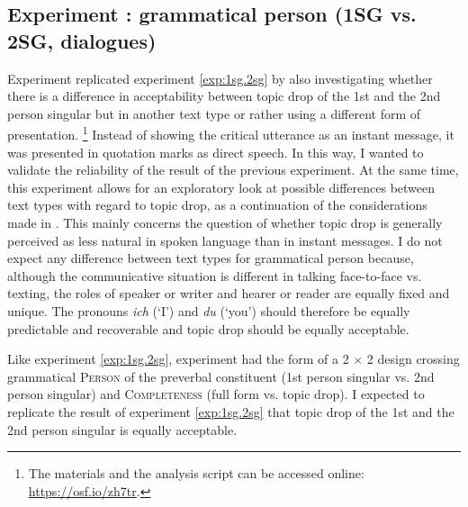 \subsection{Experiment : grammatical person (1SG vs. 2SG, dialogues) }
\label{sec:exp.1sg.2sg.spoken}
Experiment  replicated experiment \ref*{exp:1sg.2sg} by also investigating whether there is a difference in acceptability between topic drop of the 1st and the 2nd person singular but in another text type  or rather using a different form of presentation.%
\footnote{The materials and the analysis script can be accessed online: \url{https://osf.io/zh7tr}.}
%
Instead of showing the critical utterance as an instant message, it was presented in quotation marks as direct speech.
In this way, I wanted to validate the reliability of the result of the previous experiment.
At the same time, this experiment allows for an exploratory look at possible differences between text types  with regard to topic drop, as a continuation of the considerations made in .
This mainly concerns the question of whether topic drop is generally perceived as less natural in spoken language than in instant messages.
I do not expect any difference between text types  for grammatical person because, although the communicative situation is different in talking face-to-face vs. texting, the roles of speaker or writer and hearer or reader are equally fixed and unique.
The pronouns \textit{ich} (`I') and \textit{du} (`you') should therefore be equally predictable and recoverable  and topic drop should be equally acceptable.

Like experiment \ref*{exp:1sg.2sg}, experiment  had the form of a 2 $\times$ 2 design crossing grammatical \textsc{Person} of the preverbal constituent (1st person singular vs. 2nd person singular) and \textsc{Completeness} (full form vs. topic drop).
I expected to replicate the result of experiment \ref*{exp:1sg.2sg} that topic drop of the 1st and the 2nd person singular is equally acceptable.

